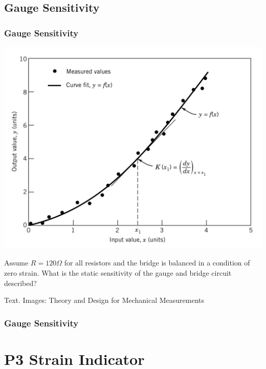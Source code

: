 \documentclass[fleqn]{beamer} %
\newcommand{\sectionIIItitle}{P3 Strain Indicator}
\newcommand{\sectionIIsubsectionIVtitle}{Gauge Sensitivity}
\begin{document}
		\subsection{\sectionIIsubsectionIVtitle}\label{sectionIIsubsectionIV}

			\begin{frame}
				\frametitle{\sectionIIsubsectionIVtitle}

				\begin{multicols}{2}

				\includegraphics[scale=.14]{images/calibration_curve.png} 

				\small
				Assume $R=120\Omega$ for all resistors and the bridge is balanced in a condition of zero strain. What is the {\PN static sensitivity} of the gauge and bridge circuit described? \vspc

				\vspc

				\end{multicols}

				{\tiny Text. Images: Theory and Design for Mechanical Measurements}

			\end{frame}

			\begin{frame}
				\frametitle{\sectionIIsubsectionIVtitle}


			\end{frame}
		
	\section{\sectionIIItitle}\label{sectionIII}
\end{document}
